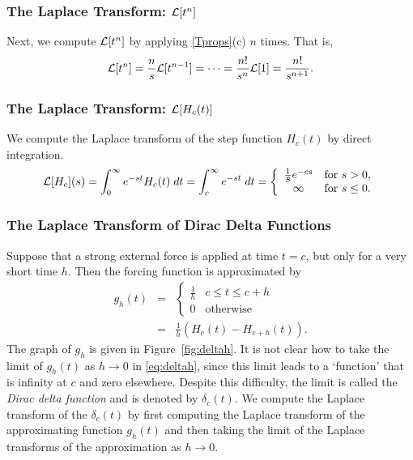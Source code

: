 \documentclass{ximera}
\begin{document}
\subsubsection*{The Laplace Transform: ${\cal L}[t^n]$}

Next, we compute ${\cal L}[t^n]$ by applying \eqref{Tprops}(c) $n$ times.
That is, 
\[
{\cal L}[t^n] = \frac{n}{s}{\cal L}[t^{n-1}] = \cdots =
\frac{n!}{s^n}{\cal L}[1] = \frac{n!}{s^{n+1}}.
\]

\subsubsection*{The Laplace Transform: ${\cal L}[H_c(t)]$}

We compute the Laplace transform of the step function $H_c(t)$ by direct 
integration.  
\[
{\cal L}[H_c](s) = \int_0^{\infty} e^{-st}H_c(t)\; dt
= \int_c^{\infty} e^{-st}\; dt
=\left\{ \begin{array}{cl} \frac{1}{\displaystyle s}e^{-cs} & \mbox{for $s>0$,}\\
\infty & \mbox{for $s\le 0$.}\end{array}\right.
\]


\subsubsection*{The Laplace Transform of Dirac Delta Functions}

Suppose that a strong external force is applied at time $t=c$, but only for a 
very short time $h$.  Then the forcing function is approximated by
\begin{equation}  \label{eq:deltah}
\begin{array}{rcl}
g_h(t) & =  & 
\left\{\begin{array}{cc} \frac{1}{h} & c\leq t \leq c+h \\ 
		0 & \mbox{otherwise} \end{array} \right. \\
 & = & \frac{1}{h} \left(H_c(t)-H_{c+h}(t)\right). 
\end{array}
\end{equation}
The graph of $g_h$ is given in Figure~\ref{fig:deltah}.  It is not clear how 
to take the limit of $g_h(t)$ as $h\to 0$ in \eqref{eq:deltah}, since this limit 
leads to a `function' that is infinity at $c$ and zero elsewhere.  Despite 
this difficulty, the limit is called the {\em Dirac delta function}
 and is denoted by $\delta_c(t)$.  We compute the 
Laplace transform of the $\delta_c(t)$ by first computing the Laplace 
transform of the approximating function $g_h(t)$ and then taking the limit of 
the Laplace transforms of the approximation as $h\to 0$.
\end{document}
